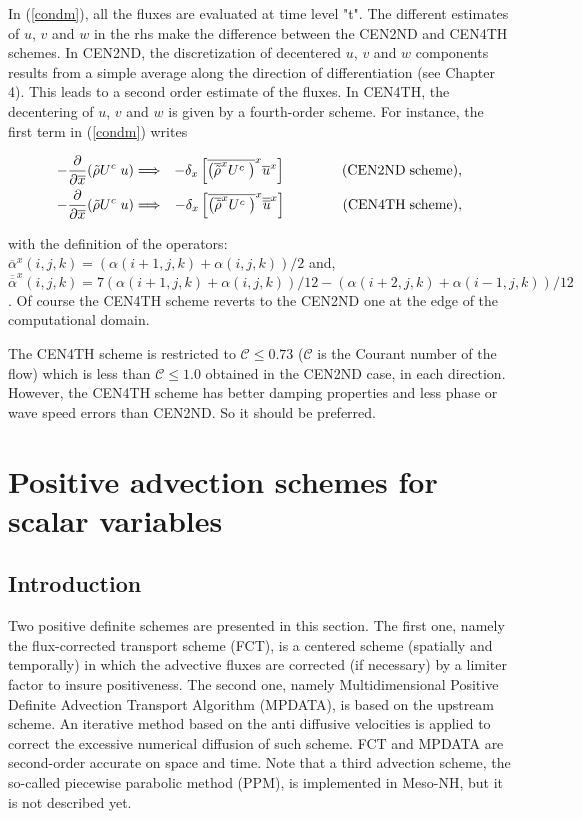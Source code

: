 In (\ref{condm}), all the fluxes are evaluated at time level "t". The different estimates of $u$, $v$ and $w$ in the rhs make the difference between the CEN2ND and CEN4TH schemes. In CEN2ND, the discretization of decentered $u$, $v$ and $w$ components results from a simple average along the direction of differentiation (see Chapter 4). This leads to a second order estimate of the fluxes. In CEN4TH, the decentering of $u$, $v$ and $w$ is given by a fourth-order scheme. For instance, the first term in (\ref{condm}) writes

\begin{eqnarray}
\label{diffm}
- \frac{\displaystyle\partial }{\displaystyle\partial \overline{x}} (\tilde{\rho} U^{c} \;   u )
 & \Longrightarrow & - \delta_{x} \left[
\overline{  \left(
\overline{\tilde{\rho}}^{x} U^{c} \;  \right)}^{x}
\overline{  u  }^{x}
 \right] \qquad \qquad {\rm (CEN2ND \; scheme)}, \\
- \frac{\displaystyle\partial }{\displaystyle\partial \overline{x}} (\tilde{\rho} U^{c} \;   u )
 & \Longrightarrow & - \delta_{x} \left[
\overline{  \left(
\overline{\tilde{\rho}}^{x} U^{c} \;  \right)}^{x}
\overline{\overline{  u  }}^{x} 
 \right] \qquad \qquad {\rm (CEN4TH \; scheme)},
\end{eqnarray}

with the definition of the operators:
$\overline{\alpha}^{x}(i,j,k)=(\alpha(i+1,j,k)+\alpha(i,j,k))/2$
and,
$\overline{\overline{\alpha}}^{x}(i,j,k)=7(\alpha(i+1,j,k)+\alpha(i,j,k))/12-(\alpha(i+2,j,k)+\alpha(i-1,j,k))/12$. Of course the CEN4TH scheme reverts to the CEN2ND one at the edge of the computational domain.

The CEN4TH scheme is restricted to $\mathcal{C}\leq0.73$ ($\mathcal{C}$ is the Courant number of the flow) which is less than $\mathcal{C}\leq1.0$ obtained in the CEN2ND case, in each direction. However, the CEN4TH scheme has better damping properties and less phase or wave speed errors than CEN2ND. So it should be preferred.

\section{Positive advection schemes for scalar variables}

\subsection{Introduction}

Two positive definite schemes are presented in this section. The first one, namely the
flux-corrected transport scheme (FCT), is a centered scheme (spatially and
temporally) in which
the advective fluxes are corrected (if necessary) by a limiter factor to insure positiveness.
The second one, namely Multidimensional Positive Definite Advection Transport Algorithm
(MPDATA), is based on the upstream scheme. An iterative method based on the anti diffusive
velocities is applied to correct the excessive numerical diffusion of such scheme.
FCT and MPDATA are second-order accurate on space and time. Note that a third advection scheme, the so-called piecewise parabolic method (PPM), is implemented in Meso-NH, but it is not described yet.

